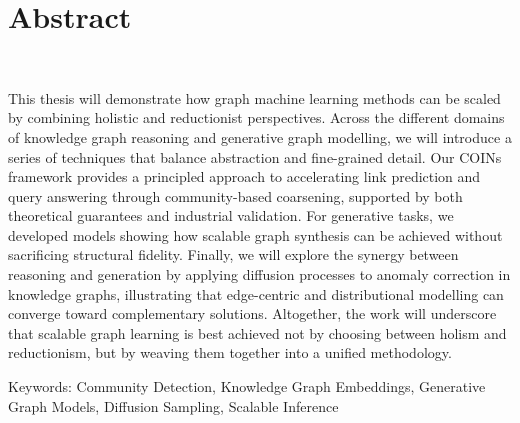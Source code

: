 

\cleardoublepage
\chapter*{Abstract}
~\newline~\newline~
This thesis will demonstrate how graph machine learning methods can be scaled by combining holistic and reductionist perspectives. Across the different domains of knowledge graph reasoning and generative graph modelling, we will introduce a series of techniques that balance abstraction and fine-grained detail. Our COINs framework provides a principled approach to accelerating link prediction and query answering through community-based coarsening, supported by both theoretical guarantees and industrial validation. For generative tasks, we developed models showing how scalable graph synthesis can be achieved without sacrificing structural fidelity. Finally, we will explore the synergy between reasoning and generation by applying diffusion processes to anomaly correction in knowledge graphs, illustrating that edge-centric and distributional modelling can converge toward complementary solutions. Altogether, the work will underscore that scalable graph learning is best achieved not by choosing between holism and reductionism, but by weaving them together into a unified methodology.

\vskip0.5cm
Keywords: Community Detection, Knowledge Graph Embeddings, Generative Graph Models, Diffusion Sampling, Scalable Inference








